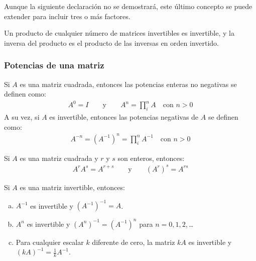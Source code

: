 \documentclass[a4paper,12pt]{article}
\begin{document}
Aunque la siguiente declaración no se demostrará, este último concepto se
puede extender para incluir tres o más factores.
\begin{concept}[i]
  Un producto de cualquier número de matrices invertibles es invertible, y la
  inversa del producto es el producto de las inversas en orden invertido.
\end{concept}

\subsubsection{Potencias de una matriz}
\begin{concept}
  Si $A$ es una matriz cuadrada, entonces las potencias enteras no negativas
  se definen como:
  \begin{align*}
    A^0=I \qquad \mbox{y} \qquad A^n=\prod_i^nA \quad\mbox{con $n>0$}
  \end{align*}
  A su vez, si $A$ es invertible, entonces las potencias negativas de
  $A$ se definen como:
  \begin{align*}
    A^{-n} = \left( A^{-1} \right)^n = \prod_i^nA^{-1} \quad\mbox{con $n>0$}
  \end{align*}
\end{concept}

\begin{theorem}
  Si $A$ es una matriz cuadrada y $r$ y $s$ son enteros, entonces:
  \begin{align*}
    A^rA^s=A^{r+s} \qquad \mbox{y} \qquad (A^r)^s=A^{rs}
  \end{align*}
  \label{theo:expmatr}
\end{theorem}

\begin{theorem}
  Si $A$ es una matriz invertible, entonces:
  \begin{enumerate}[(a)]
    \item $A^{-1}$ es invertible y $(A^{-1})^{-1}=A$.
    \item $A^n$ es invertible y $(A^n)^{-1}=(A^{-1})^n$ para $n=0,1,2,$\ldots
    \item Para cualquier escalar $k$ diferente de cero, la matriz $kA$ es
      invertible y $(kA)^{-1}=\tfrac{1}{k}A^{-1}$.
  \end{enumerate}
  \label{theo:expmatr2}
\end{theorem}
\end{document}
